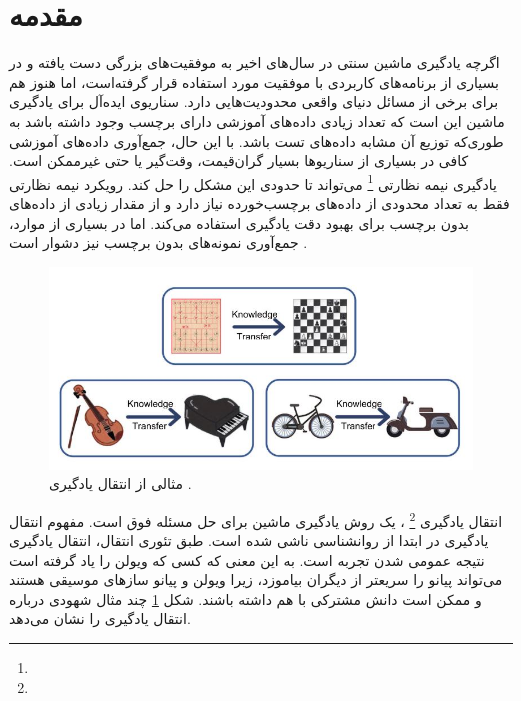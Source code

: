 \section{مقدمه}
{
	اگرچه یادگیری ماشین سنتی در سال‌های اخیر به موفقیت‌های بزرگی دست یافته و در بسیاری از برنامه‌های کاربردی با موفقیت مورد استفاده قرار گرفته‌است، اما هنوز هم برای برخی از مسائل دنیای واقعی محدودیت‌هایی دارد. سناریوی ایده‌آل برای یادگیری ماشین این است که تعداد زیادی داده‌های آموزشی دارای برچسب وجود داشته باشد به طوری‌که توزیع آن مشابه داده‌های تست باشد. با این حال، جمع‌آوری داده‌های آموزشی کافی در بسیاری از سناریوها بسیار گران‌قیمت، وقت‌گیر یا حتی غیرممکن است. یادگیری نیمه نظارتی
	\footnote{}
	 می‌تواند تا حدودی این مشکل را حل کند. رویکرد نیمه نظارتی فقط به تعداد محدودی از داده‌های برچسب‌‌‌خورده نیاز دارد و از مقدار زیادی از داده‌های بدون برچسب برای بهبود دقت یادگیری استفاده می‌کند. اما در بسیاری از موارد، جمع‌آوری نمونه‌های بدون برچسب نیز دشوار است
	\cite{zhuang2020comprehensive}.
	
	\begin{figure}[h]
		\centering
		\includegraphics[scale=0.4]{images/example.jpg}
		\caption{مثالی از انتقال یادگیری \cite{zhuang2020comprehensive}.}
		\label{fig:9}
	\end{figure}
	انتقال یادگیری
	\footnote{}
	، یک روش یادگیری ماشین برای حل مسئله فوق است. مفهوم انتقال یادگیری در ابتدا از روانشناسی ناشی شده است. طبق تئوری انتقال، انتقال یادگیری نتیجه عمومی شدن تجربه است. به  این معنی که کسی که ویولن را یاد گرفته است می‌تواند پیانو را سریعتر از دیگران بیاموزد، زیرا ویولن و پیانو سازهای موسیقی هستند و ممکن است دانش مشترکی با هم داشته باشند. شکل
	\ref{fig:9}
	چند مثال شهودی درباره انتقال یادگیری را نشان می‌دهد.
	
}
